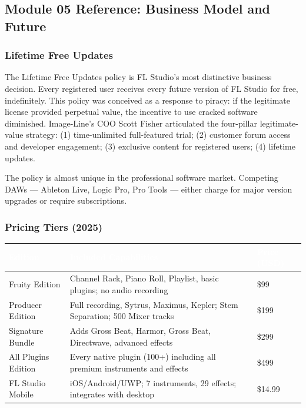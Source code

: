 \documentclass[11pt,letterpaper]{article}
\newcommand{\tableheader}[1]{\textbf{\sffamily\textcolor{white}{#1}}}
\begin{document}
\subsection{Module 05 Reference: Business Model and Future}

\subsubsection{Lifetime Free Updates}

The Lifetime Free Updates policy is FL Studio's most distinctive business decision. Every registered user receives every future version of FL Studio for free, indefinitely. This policy was conceived as a response to piracy: if the legitimate license provided perpetual value, the incentive to use cracked software diminished. Image-Line's COO Scott Fisher articulated the four-pillar legitimate-value strategy: (1) time-unlimited full-featured trial; (2) customer forum access and developer engagement; (3) exclusive content for registered users; (4) lifetime updates.

The policy is almost unique in the professional software market. Competing DAWs --- Ableton Live, Logic Pro, Pro Tools --- either charge for major version upgrades or require subscriptions.

\subsubsection{Pricing Tiers (2025)}

\begin{center}
\begin{tabularx}{\textwidth}{L{3.5cm}XC{2.5cm}}
\toprule
{}
\tableheader{Edition} & \tableheader{Included Capabilities} & \tableheader{Price (USD)} \\
\midrule
Fruity Edition & Channel Rack, Piano Roll, Playlist, basic plugins; no audio recording & \$99 \\
Producer Edition & Full recording, Sytrus, Maximus, Kepler; Stem Separation; 500 Mixer tracks & \$199 \\
Signature Bundle & Adds Gross Beat, Harmor, Gross Beat, Directwave, advanced effects & \$299 \\
All Plugins Edition & Every native plugin (100+) including all premium instruments and effects & \$499 \\
FL Studio Mobile & iOS/Android/UWP; 7 instruments, 29 effects; integrates with desktop & \$14.99 \\
\bottomrule
\end{tabularx}
\end{center}
\end{document}
